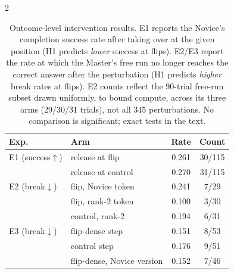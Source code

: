 \documentclass[9pt]{article}
\begin{document}
\begin{multicols}{2}
\begin{table}[H]
  \footnotesize
  \setlength{\tabcolsep}{3.5pt}
  \centering
  \caption{Outcome-level intervention results. E1 reports the Novice's
    completion success rate after taking over at the given position (H1
    predicts \emph{lower} success at flips). E2/E3 report the rate at which the
    Master's free run no longer reaches the correct answer after the
    perturbation (H1 predicts \emph{higher} break rates at flips). E2 counts
    reflect the 90-trial free-run subset drawn uniformly, to bound compute,
    across its three arms (29/30/31 trials), not all 345 perturbations. No
    comparison is significant; exact tests in the text.}
  \label{tab:outcome}
  \begin{tabular}{llcc}
    \toprule
    Exp. & Arm & Rate & Count \\
    \midrule
    E1 (success$\uparrow$) & release at flip      & 0.261 & 30/115 \\
                           & release at control   & 0.270 & 31/115 \\
    \midrule
    E2 (break$\downarrow$) & flip, Novice token   & 0.241 & 7/29 \\
                           & flip, rank-2 token   & 0.100 & 3/30 \\
                           & control, rank-2      & 0.194 & 6/31 \\
    \midrule
    E3 (break$\downarrow$) & flip-dense step      & 0.151 & 8/53 \\
                           & control step         & 0.176 & 9/51 \\
                           & flip-dense, Novice version & 0.152 & 7/46 \\
    \bottomrule
  \end{tabular}
\end{table}


\end{multicols}
\end{document}
